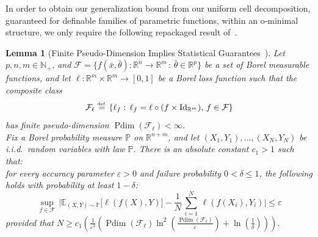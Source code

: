 \documentclass{article}
\newcommand{\eqdef}{\ensuremath{\stackrel{\mbox{\upshape\tiny def.}}{=}}}
\theoremstyle{plain}
\newtheorem{lemma}[theorem]{Lemma}
\theoremstyle{definition}
\theoremstyle{remark}
\newcommand{\reals}{\mathbb{R}}
\newcommand{\calF}{\mathcal{F}}
\theoremstyle{plain}
\numberwithin{thm}{section}
\theoremstyle{definition}
\numberwithin{equation}{section}
\begin{document}
In order to obtain our generalization bound from our uniform cell decomposition, guaranteed for definable families of parametric functions, within an o-minimal structure, we only require the following repackaged result of~\cite{AlonBenDavidCesaBianchiHaussler_PDGeneralization}.
\begin{lemma}[Finite Pseudo-Dimension Implies Statistical Guarantees~\cite{AlonBenDavidCesaBianchiHaussler_PDGeneralization}]
\label{lem:Pd_2_Gen}
Let $p,n,m\in \mathbb{N}_+$, and
$\calF=\{f(\bar{x},\bar{\theta}):\mathbb{R}^n\to \mathbb{R}^m \,:\, \bar{\theta}\in \reals^p\}$
be a set of Borel measurable functions, and let $\ell:\mathbb{R}^m\times \mathbb{R}^m\to [0,1]$
be a Borel loss function such that the composite class
\begin{equation}
\label{eq:compositeclass}
\mathcal{F}_{\ell}
 \eqdef 
\{\ell_f:\, \ell_f  =  \ell\circ (f\times \operatorname{Id}_{\mathbb{R}^m}) 
,\, 
f\in \mathcal{F}\}
\end{equation}
has finite pseudo-dimension $\operatorname{Pdim}(\mathcal{F}_{\ell})<\infty$.
\\
\noindent Fix a Borel probability measure $\mathbb{P}$ on $\mathbb{R}^{n+m}$, and let
$(X_1,Y_1),\dots,(X_N,Y_N)$ be i.i.d.\ random variables with law $\mathbb{P}$.  
There is an absolute constant $c_1>1$ such that:
\\
\noindent for every accuracy parameter $\varepsilon>0$ and failure probability $0<\delta \le 1$,
the following holds with probability at least $1-\delta$:
\[
\sup_{f\in \calF}\,
\biggl|
    \mathbb{E}_{(X,Y)\sim \mathbb{P}}\big[
        \ell(f(X),Y)
    \big]
    -
    \frac1{N}\,\sum_{i=1}^N\,
        \ell(f(X_i),Y_i)
\biggr|
\le
\varepsilon
\]
provided that
$
N
\ge
    c_1\left( \frac{1}{\varepsilon^2} \left(
        \operatorname{Pdim}(\mathcal{F}_{\ell})
        \ln^2\left(\frac{
                \operatorname{Pdim}(\mathcal{F}_{\ell})
            }{\varepsilon}\right) + \ln\left(\frac{1}{\delta}\right) \right) \right)
$.
\end{lemma}
\end{document}
